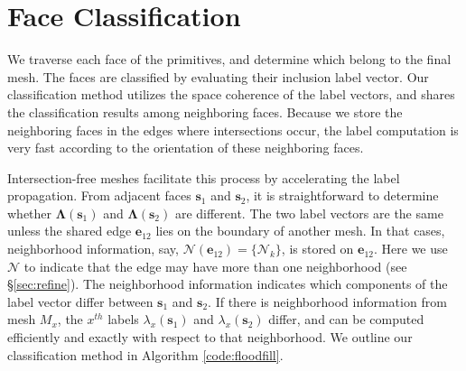 

\section{Face Classification}

\label{sec:classification}

We traverse each face of the primitives, and determine which belong to the final mesh. The faces are classified by evaluating their inclusion label vector. Our classification method utilizes the space coherence of the label vectors, and shares the classification results among neighboring faces. Because we store the neighboring faces in the edges where intersections occur, the label computation is very fast according to the orientation of these neighboring faces.


Intersection-free meshes facilitate this process by accelerating the label propagation. From adjacent faces $\bm{s}_1$ and $\bm{s}_2$, it is straightforward to determine whether $\bm{\Lambda}(\bm{s}_1)$ and $\bm{\Lambda}(\bm{s}_2)$ are different. The two label vectors are the same unless the shared edge $\bm{e}_{12}$ lies on the boundary of another mesh. In that cases, neighborhood information, say, $\bm{\mathcal{N}}(\bm{e}_{12}) = \{\mathcal{N}_k\}$, is stored on $\bm{e}_{12}$. Here we use $\bm{\mathcal{N}}$ to indicate that the edge may have more than one neighborhood (see \S\ref{sec:refine}). The neighborhood information indicates which components of the label vector differ between $\bm{s}_1$ and $\bm{s}_2$. If there is neighborhood information from mesh $M_x$, the $x^{th}$ labels $\lambda_x(\bm{s}_1)$ and $\lambda_x(\bm{s}_2)$ differ, and can be computed efficiently and exactly with respect to that neighborhood. We outline our classification method in Algorithm \ref{code:floodfill}.


